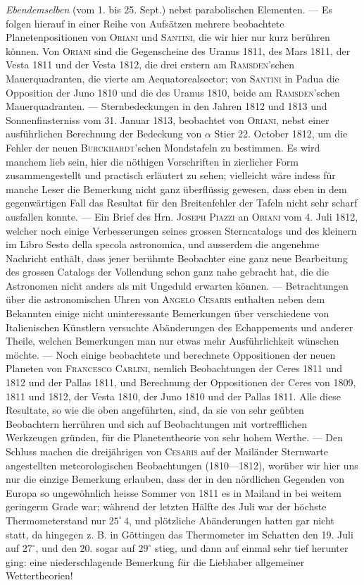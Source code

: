 \emph{Ebendemselben} (vom 1. bis 25. Sept.) nebst parabolischen Elementen. --- Es folgen hierauf in einer Reihe von Aufsätzen mehrere beobachtete Planetenpositionen von \textsc{Oriani} und \textsc{Santini}, die wir hier nur kurz berühren können. Von \textsc{Oriani} sind die Gegenscheine des Uranus 1811, des Mars 1811, der Vesta 1811 und der Vesta 1812, die drei erstern am \textsc{Ramsden}'schen Mauerquadranten, die vierte am Aequatorealsector; von \textsc{Santini} in Padua die Opposition der Juno 1810 und die des Uranus 1810, beide am \textsc{Ramsden}'schen Mauerquadranten. --- Sternbedeckungen in den Jahren 1812 und 1813 und Sonnenfinsterniss vom 31. Januar 1813, beobachtet von \textsc{Oriani}, nebst einer ausführlichen Berechnung der Bedeckung von $\alpha$ Stier 22. October 1812, um die Fehler der neuen \textsc{Burckhardt}'schen Mondstafeln zu bestimmen. Es wird manchem lieb sein, hier die nöthigen Vorschriften in zierlicher Form zusammengestellt und practisch erläutert zu sehen; vielleicht wäre indess für manche Leser die Bemerkung nicht ganz überflüssig gewesen, dass eben in dem gegenwärtigen Fall das Resultat für den Breitenfehler der Tafeln nicht sehr scharf ausfallen konnte. --- Ein Brief des Hrn. \textsc{Joseph Piazzi} an \textsc{Oriani} vom 4. Juli 1812, welcher noch einige Verbesserungen seines grossen Sterncatalogs und des kleinern im Libro Sesto della specola astronomica, und ausserdem die angenehme Nachricht enthält, dass jener berühmte Beobachter eine ganz neue Bearbeitung des grossen Catalogs der Vollendung schon ganz nahe gebracht hat, die die Astronomen nicht anders als mit Ungeduld erwarten können. --- Betrachtungen über die astronomischen Uhren von \textsc{Angelo Cesaris} enthalten neben dem Bekannten einige nicht uninteressante Bemerkungen über verschiedene von Italienischen Künstlern versuchte Abänderungen des Echappements und anderer Theile, welchen Bemerkungen man nur etwas mehr Ausführlichkeit wünschen möchte. --- Noch einige beobachtete und berechnete Oppositionen der neuen Planeten von \textsc{Francesco Carlini}, nemlich Beobachtungen der Ceres 1811 und 1812 und der Pallas 1811, und Berechnung der Oppositionen der Ceres von 1809, 1811 und 1812, der Vesta 1810, der Juno 1810 und der Pallas 1811. Alle diese Resultate, so wie die oben angeführten, sind, da sie von sehr geübten Beobachtern herrühren und sich auf Beobachtungen mit vortrefflichen Werkzeugen gründen, für die Planetentheorie von sehr hohem Werthe. --- Den Schluss machen die dreijährigen von \textsc{Cesaris} auf der Mailänder Sternwarte angestellten meteorologischen Beobachtungen (1810---1812), worüber wir hier uns nur die einzige Bemerkung erlauben, dass der in den nördlichen Gegenden von Europa so ungewöhnlich heisse Sommer von 1811 es in Mailand in bei weitem geringerm Grade war; während der letzten Hälfte des Juli war der höchste Thermometerstand nur $25^\circ\,4$, und plötzliche Abänderungen hatten gar nicht statt, da hingegen z. B. in Göttingen das Thermometer im Schatten den 19. Juli auf $27^\circ$, und den 20. sogar auf $29^\circ$ stieg, und dann auf einmal sehr tief herunter ging: eine niederschlagende Bemerkung für die Liebhaber allgemeiner Wettertheorien!
